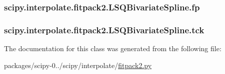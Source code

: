 \subsubsection[{fp}]{\setlength{\rightskip}{0pt plus 5cm}scipy.\+interpolate.\+fitpack2.\+L\+S\+Q\+Bivariate\+Spline.\+fp}\label{classscipy_1_1interpolate_1_1fitpack2_1_1LSQBivariateSpline_a22d30295a3687461ff4ba6aa58f3d798}
\hypertarget{classscipy_1_1interpolate_1_1fitpack2_1_1LSQBivariateSpline_aaed5d976271ef387e4b3c8dcc8db84ef}{}
\subsubsection[{tck}]{\setlength{\rightskip}{0pt plus 5cm}scipy.\+interpolate.\+fitpack2.\+L\+S\+Q\+Bivariate\+Spline.\+tck}\label{classscipy_1_1interpolate_1_1fitpack2_1_1LSQBivariateSpline_aaed5d976271ef387e4b3c8dcc8db84ef}


The documentation for this class was generated from the following file\+:\begin{DoxyCompactItemize}
\item 
packages/scipy-\/0../scipy/interpolate/\hyperlink{fitpack2_8py}{fitpack2.\+py}\end{DoxyCompactItemize}
